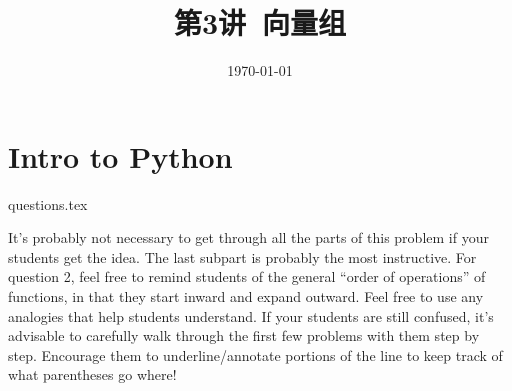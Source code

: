 \documentclass[12pt]{exam}
\title{第3讲\ 向量组}
\author{}
\date{\today}
\begin{document}
\maketitle

\section{Intro to Python}
\begin{questions}
{questions.tex}
\begin{questionmeta}
  It's probably not necessary to get through all the parts of this problem if your students get the idea. The last subpart is probably the most instructive. 
  For question 2, feel free to remind students of the general ``order of operations'' of functions, in that they start inward and expand outward. Feel free to use any analogies that help students understand.
  If your students are still confused, it's advisable to carefully walk through the first few problems with them step by step. Encourage them to underline/annotate portions of the line to keep track of what parentheses go where!
\end{questionmeta}
\end{questions}
\end{document}
